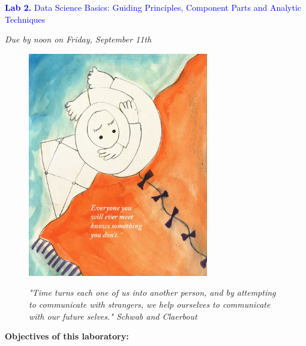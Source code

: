 \documentclass{article}
\begin{document}
\vspace*{.01mm}

\begin{center}

\Large{\textcolor{blue}{\textbf{Lab 2.}  Data Science Basics: Guiding Principles, Component Parts and Analytic Techniques}}  \\ %

\vspace{4mm}

\textit{Due by noon on Friday, September 11th}\\

\end{center}

\begin{figure}[h!]
\begin{center}
\includegraphics[width=0.7\textwidth]{everyone.png}

\vspace{10mm}

\large{\textit{"Time turns each one of us into another person, and by attempting to communicate with strangers, we help ourselves to communicate with our future selves."  Schwab and Claerbout} } \\

\end{center}
\end{figure}


\newpage


\large{\textbf{Objectives of this laboratory:}}
\end{document}
